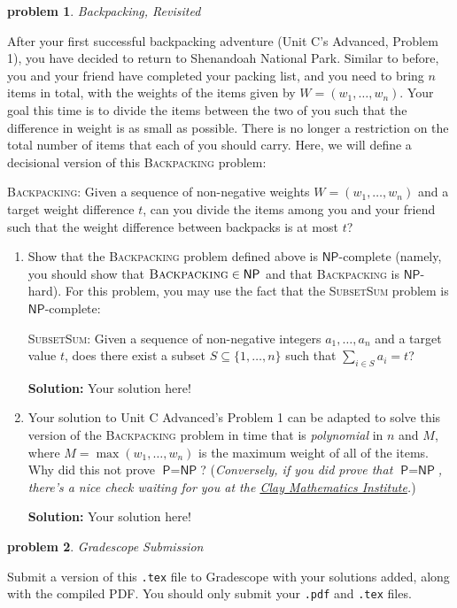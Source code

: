 \documentclass[10pt]{article}
\newcommand{\solution}[1]{\color{blue}\hfill\break\noindent\textbf{Solution:} #1\color{black}}
\newtheorem{problem}{\sc\color{cit}problem}
\begin{document}
\begin{problem} Backpacking, Revisited \end{problem}
After your first successful backpacking adventure (Unit C's Advanced, Problem 1), you have decided to return to
Shenandoah National Park. Similar to before, you and your friend have completed your packing list, and you need
to bring $n$ items in total, with the weights of the items given by $W = (w_1, \ldots, w_n)$. Your goal
this time is to divide the items between the two of you such that the difference in weight is as small as possible.
There is no longer a restriction on the total number of items that each of you should carry.
Here, we will define a decisional version of this \textsc{Backpacking} problem:
\begin{framed}
  \noindent
  \textsc{Backpacking}: Given a sequence of non-negative weights $W = (w_1, \ldots, w_n)$ and a target weight difference
  $t$, can you divide the items among you and your friend such that the weight difference between backpacks is at most $t$?
\end{framed}
\begin{enumerate}
  \item Show that the \textsc{Backpacking} problem defined above is $\mathsf{NP}$-complete (namely, you should
  show that $\textsc{Backpacking} \in \mathsf{NP}$ and that \textsc{Backpacking} is $\mathsf{NP}$-hard). For this
  problem, you may use the fact that the \textsc{SubsetSum} problem is $\mathsf{NP}$-complete:

  \begin{minipage}[t]{\linewidth}
  \begin{framed}
    \textsc{SubsetSum}: Given a sequence of non-negative integers $a_1, \ldots, a_n$
    and a target value $t$, does there exist
    a subset $S \subseteq \{ 1, \ldots, n \}$ such that $\sum_{i \in S} a_i = t$?
  \end{framed}
  \end{minipage}
  
  \solution{ Your solution here! }

  \item Your solution to Unit C Advanced's Problem 1 can be adapted to solve this version of the \textsc{Backpacking} problem
  in time that is {\em polynomial} in $n$ and $M$, where $M = \max(w_1, \ldots, w_n)$ is the maximum weight of all of the items. Why did this
  not prove $\textsf{P} = \textsf{NP}$? ({\em Conversely, if you did prove that $\textsf{P} = \textsf{NP}$, there's a nice
  check waiting for you at the \href{https://www.claymath.org/millennium-problems/p-vs-np-problem}{Clay Mathematics Institute}.})
  
  \solution{ Your solution here! }
\end{enumerate}


\begin{problem} Gradescope Submission \end{problem}
Submit a version of this \verb|.tex| file to Gradescope with your solutions added, along with the compiled PDF.  You should only submit your \verb|.pdf| and \verb|.tex| files.
\end{document}
